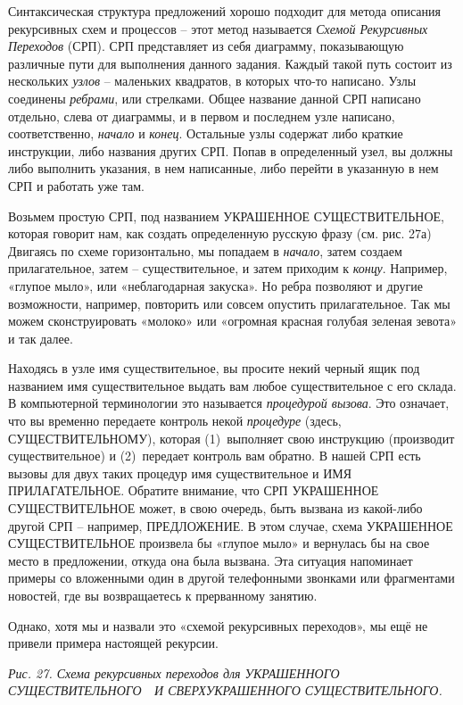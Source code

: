 \documentclass[../main.tex]{subfiles}
\begin{document}
Синтаксическая структура предложений хорошо подходит для метода описания рекурсивных схем и процессов \--- этот метод называется \emph{Схемой Рекурсивных Переходов} (СРП). СРП представляет из себя диаграмму, показывающую различные пути для выполнения данного задания. Каждый такой путь состоит из нескольких \emph{узлов} \--- маленьких квадратов, в которых что-то написано. Узлы соединены \emph{ребрами}, или стрелками. Общее название данной СРП написано отдельно, слева от диаграммы, и в первом и последнем узле написано, соответственно, \emph{начало} и \emph{конец}. Остальные узлы содержат либо краткие инструкции, либо названия других СРП\@. Попав в определенный узел, вы должны либо выполнить указания, в нем написанные, либо перейти в указанную в нем СРП и работать уже там.

Возьмем простую СРП, под названием УКРАШЕННОЕ СУЩЕСТВИТЕЛЬНОЕ, которая говорит нам, как создать определенную русскую фразу (см. рис. 27а) Двигаясь по схеме горизонтально, мы попадаем в \emph{начало}, затем создаем прилагательное, затем \--- существительное, и затем приходим к \emph{концу}. Например, «глупое мыло», или «неблагодарная закуска». Но ребра позволяют и другие возможности, например, повторить или совсем опустить прилагательное. Так мы можем сконструировать «молоко» или «огромная красная голубая зеленая зевота» и так далее.

Находясь в узле имя существительное, вы просите некий черный ящик под названием имя существительное выдать вам любое существительное с его склада. В компьютерной терминологии это называется \emph{процедурой вызова}. Это означает, что вы временно передаете контроль некой \emph{процедуре} (здесь, СУЩЕСТВИТЕЛЬНОМУ), которая (1)~выполняет свою инструкцию (производит существительное) и (2)~передает контроль вам обратно. В нашей СРП есть вызовы для двух таких процедур имя существительное и ИМЯ ПРИЛАГАТЕЛЬНОЕ\@. Обратите внимание, что СРП УКРАШЕННОЕ СУЩЕСТВИТЕЛЬНОЕ может, в свою очередь, быть вызвана из какой-либо другой СРП \--- например, ПРЕДЛОЖЕНИЕ\@. В этом случае, схема УКРАШЕННОЕ СУЩЕСТВИТЕЛЬНОЕ произвела бы «глупое мыло» и вернулась бы на свое место в предложении, откуда она была вызвана. Эта ситуация напоминает примеры со вложенными один в другой телефонными звонками или фрагментами новостей, где вы возвращаетесь к прерванному занятию.

Однако, хотя мы и назвали это «схемой рекурсивных переходов», мы ещё не привели примера настоящей рекурсии.

\emph{Рис. 27. Схема рекурсивных переходов для УКРАШЕННОГО СУЩЕСТВИТЕЛЬНОГО~~И СВЕРХУКРАШЕННОГО СУЩЕСТВИТЕЛЬНОГО.}
\end{document}
